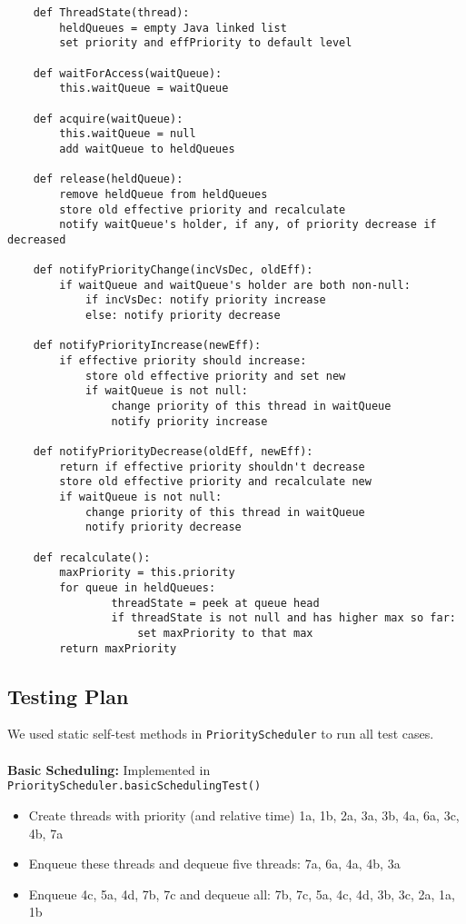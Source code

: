 \documentclass{article}
\begin{document}
\begin{lstlisting}
    def ThreadState(thread):
        heldQueues = empty Java linked list
        set priority and effPriority to default level

    def waitForAccess(waitQueue):
        this.waitQueue = waitQueue

    def acquire(waitQueue):
        this.waitQueue = null
        add waitQueue to heldQueues

    def release(heldQueue):
        remove heldQueue from heldQueues
        store old effective priority and recalculate
        notify waitQueue's holder, if any, of priority decrease if decreased

    def notifyPriorityChange(incVsDec, oldEff):
        if waitQueue and waitQueue's holder are both non-null:
            if incVsDec: notify priority increase
            else: notify priority decrease

    def notifyPriorityIncrease(newEff):
        if effective priority should increase:
            store old effective priority and set new
            if waitQueue is not null:
                change priority of this thread in waitQueue
                notify priority increase

    def notifyPriorityDecrease(oldEff, newEff):
        return if effective priority shouldn't decrease
        store old effective priority and recalculate new
        if waitQueue is not null:
            change priority of this thread in waitQueue
            notify priority decrease

    def recalculate():
        maxPriority = this.priority
        for queue in heldQueues:
                threadState = peek at queue head
                if threadState is not null and has higher max so far:
                    set maxPriority to that max
        return maxPriority
\end{lstlisting}
\normalsize

\subsection{Testing Plan}
We used static self-test methods in \texttt{PriorityScheduler} to run all test cases. \\\\
\textbf{Basic Scheduling:}
Implemented in \texttt{PriorityScheduler.basicSchedulingTest()}
\begin{itemize}
\item Create threads with priority (and relative time) 1a, 1b, 2a, 3a, 3b, 4a, 6a, 3c, 4b, 7a
\item Enqueue these threads and dequeue five threads: 7a, 6a, 4a, 4b, 3a
\item Enqueue 4c, 5a, 4d, 7b, 7c and dequeue all: 7b, 7c, 5a, 4c, 4d, 3b, 3c, 2a, 1a, 1b
\end{itemize}
\end{document}

